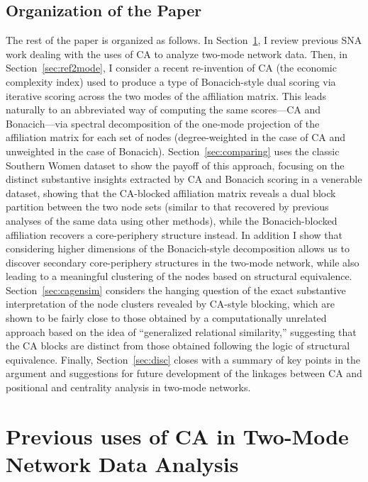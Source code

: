\documentclass[a4paper,fleqn]{cas-sc}
\begin{document}
\subsection{Organization of the Paper} \label{subsec:org}
The rest of the paper is organized as follows. In Section~\ref{sec:prevuses}, I review previous SNA work dealing with the uses of CA to analyze two-mode network data. Then, in Section~\ref{sec:ref2mode}, I consider a recent re-invention of CA (the economic complexity index) used to produce a type of Bonacich-style dual scoring via iterative scoring across the two modes of the affiliation matrix. This leads naturally to an abbreviated way of computing the same scores---CA and Bonacich---via spectral decomposition of the one-mode projection of the affiliation matrix for each set of nodes (degree-weighted in the case of CA and unweighted in the case of Bonacich). Section~\ref{sec:comparing} uses the classic Southern Women dataset to show the payoff of this approach, focusing on the distinct substantive insights extracted by CA and Bonacich scoring in a venerable dataset, showing that the CA-blocked affiliation matrix reveals a dual block partition between the two node sets (similar to that recovered by previous analyses of the same data using other methods), while the Bonacich-blocked affiliation recovers a core-periphery structure instead. In addition I show that considering higher dimensions of the Bonacich-style decomposition allows us to discover secondary core-periphery structures in the two-mode network, while also leading to a meaningful clustering of the nodes based on structural equivalence. Section~\ref{sec:cagensim} considers the hanging question of the exact substantive interpretation of the node clusters revealed by CA-style blocking, which are shown to be fairly close to those obtained by a computationally unrelated approach based on the idea of ``generalized relational similarity,'' suggesting that the CA blocks are distinct from those obtained following the logic of structural equivalence. Finally, Section~\ref{sec:disc} closes with a summary of key points in the argument and suggestions for future development of the linkages between CA and positional and centrality analysis in two-mode networks.  

\section{Previous uses of CA in Two-Mode Network Data Analysis} \label{sec:prevuses}
\end{document}

